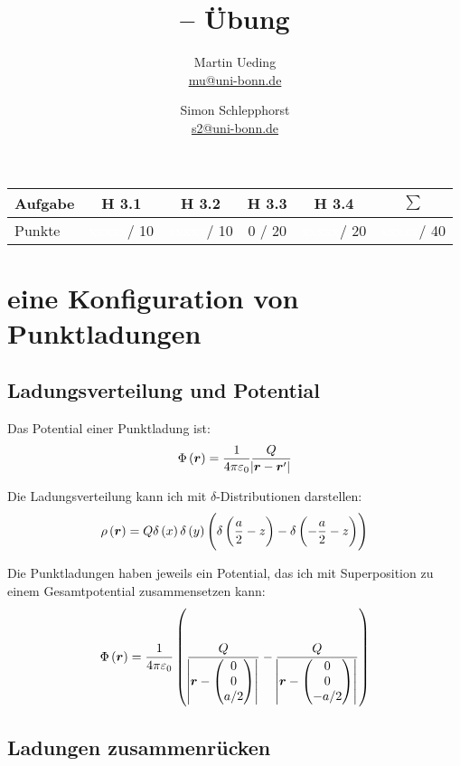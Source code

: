 \documentclass[11pt, ngerman, fleqn]{article}
\title{\themodul{} -- Übung \theuebung \\ \vspace{0.5cm} \large{\thegruppe}}
\author{Martin Ueding \\ \small{\href{mailto:mu@uni-bonn.de}{mu@uni-bonn.de}} \and Simon Schlepphorst \\ \small{\href{mailto:s2@uni-bonn.de}{s2@uni-bonn.de}}}
\newcommand{\punkte}{\textcolor{white}{xxxxx}}
\renewcommand{\vec}[1]{\boldsymbol{#1}}
\newcommand{\theuebung}{3}
\begin{document}
\maketitle

\begin{table}[h]
	\centering
	\begin{tabular}{l|c|c|c|c|c}
		Aufgabe & H \theuebung.1 & H \theuebung.2 & H \theuebung.3 & H \theuebung.4 & $\sum$   \\
		\hline
		Punkte & \punkte / 10 & \punkte / 10 & 0 / 20 & \punkte / 20 & \punkte / 40
	\end{tabular}
\end{table}


\section{eine Konfiguration von Punktladungen}

\subsection{Ladungsverteilung und Potential}

Das Potential einer Punktladung ist:
\[
	\Phi\del{\vec r} = \frac{1}{4\pi\varepsilon_0} \frac{Q}{\abs{\vec r - \vec r'}}
\]

Die Ladungsverteilung kann ich mit $\delta$-Distributionen darstellen:
\[
	\rho\del{\vec r} = Q \delta\del{x} \delta\del{y} \del{
		\delta\del{\frac a2 - z} - \delta\del{-\frac a2 - z}
	}
\]

Die Punktladungen haben jeweils ein Potential, das ich mit Superposition zu
einem Gesamtpotential zusammensetzen kann:
\[
	\Phi\del{\vec r} = \frac{1}{4 \pi \varepsilon_0} \del{
		\frac{Q}{\abs{\vec r - \begin{pmatrix}
	0 \\ 0 \\ a/2
	\end{pmatrix}}} - \frac{Q}{\abs{\vec r - \begin{pmatrix}
	0 \\ 0 \\ - a/2
	\end{pmatrix}}}
	}
\]

\subsection{Ladungen zusammenrücken}
\end{document}

